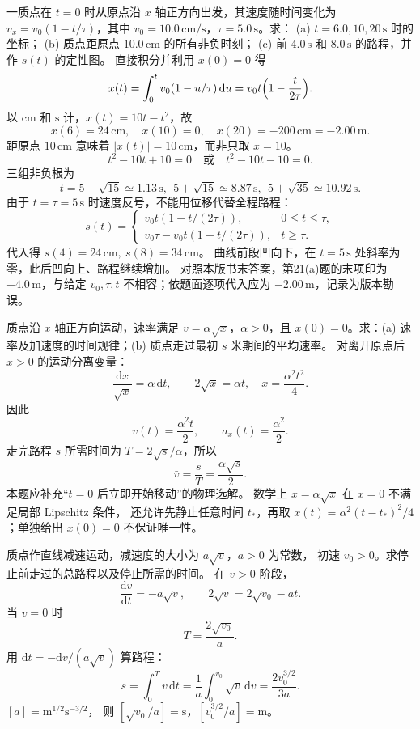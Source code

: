 一质点在 $t=0$ 时从原点沿 $x$ 轴正方向出发，其速度随时间变化为
$v_x=v_0(1-t/\tau)$，其中 $v_0=10.0\,\mathrm{cm/s}$，$\tau=5.0\,\mathrm s$。求：
(a) $t=6.0,10,20\,\mathrm s$ 时的坐标；
(b) 质点距原点 $10.0\,\mathrm{cm}$ 的所有非负时刻；
(c) 前 $4.0\,\mathrm s$ 和 $8.0\,\mathrm s$ 的路程，并作 $s(t)$ 的定性图。
\exsolution
直接积分并利用 $x(0)=0$ 得
\[
 x(t)=\int_0^t v_0(1-u/\tau)\,\mathrm du
 =v_0t\Bigl(1-\frac{t}{2\tau}\Bigr).
\]
以 $\mathrm{cm}$ 和 $\mathrm s$ 计，$x(t)=10t-t^2$，故
\[
 \boxed{x(6)=24\,\mathrm{cm},\quad x(10)=0,\quad
 x(20)=-200\,\mathrm{cm}=-2.00\,\mathrm m.}
\]
距原点 $10\,\mathrm{cm}$ 意味着 $|x(t)|=10\,\mathrm{cm}$，而非只取 $x=10$。
\[
 t^2-10t+10=0\quad\text{或}\quad t^2-10t-10=0.
\]
三组非负根为
\[
 \boxed{t=5-\sqrt{15}\simeq1.13\,\mathrm s,\ \
 5+\sqrt{15}\simeq8.87\,\mathrm s,\ \
 5+\sqrt{35}\simeq10.92\,\mathrm s.}
\]
由于 $t=\tau=5\,\mathrm s$ 时速度反号，不能用位移代替全程路程：
\[
 s(t)=\begin{cases}
 v_0t(1-t/(2\tau)),&0\le t\le\tau,\\
 v_0\tau-v_0t(1-t/(2\tau)),&t\ge\tau .
 \end{cases}
\]
代入得 $\boxed{s(4)=24\,\mathrm{cm},\ s(8)=34\,\mathrm{cm}}$。
曲线前段凹向下，在 $t=5\,\mathrm s$ 处斜率为零，此后凹向上、路程继续增加。
\excheck 对照本版书末答案，第21(a)题的末项印为 $-4.0\,\mathrm m$，与给定
$v_0,\tau,t$ 不相容；依题面逐项代入应为 $-2.00\,\mathrm m$，记录为版本勘误。

质点沿 $x$ 轴正方向运动，速率满足 $v=\alpha\sqrt{x}$，$\alpha>0$，且
$x(0)=0$。求：(a) 速率及加速度的时间规律；(b) 质点走过最初 $s$ 米期间的平均速率。
\exsolution
对离开原点后 $x>0$ 的运动分离变量：
\[
 \frac{\mathrm dx}{\sqrt{x}}=\alpha\,\mathrm dt,\qquad
 2\sqrt{x}=\alpha t,
\quad x=\frac{\alpha^2t^2}{4}.
\]
因此
\[
 \boxed{v(t)=\frac{\alpha^2t}{2},\qquad a_x(t)=\frac{\alpha^2}{2}.}
\]
走完路程 $s$ 所需时间为 $T=2\sqrt{s}/\alpha$，所以
\[
 \boxed{\bar v=\frac{s}{T}=\frac{\alpha\sqrt{s}}2.}
\]
\excheck 本题应补充“$t=0$ 后立即开始移动”的物理选解。
数学上 $\dot x=\alpha\sqrt{x}$ 在 $x=0$ 不满足局部 Lipschitz 条件，
还允许先静止任意时间 $t_*$，再取
$x(t)=\alpha^2(t-t_*)^2/4$；单独给出 $x(0)=0$ 不保证唯一性。

质点作直线减速运动，减速度的大小为 $a\sqrt v$，$a>0$ 为常数，
初速 $v_0>0$。求停止前走过的总路程以及停止所需的时间。
\exsolution
在 $v>0$ 阶段，
\[
 \frac{\mathrm dv}{\mathrm dt}=-a\sqrt v,\qquad
 2\sqrt v=2\sqrt{v_0}-at.
\]
当 $v=0$ 时
\[
 \boxed{T=\frac{2\sqrt{v_0}}a.}
\]
用 $\mathrm dt=-\mathrm dv/(a\sqrt v)$ 算路程：
\[
 s=\int_0^T v\,\mathrm dt
   =\frac1a\int_0^{v_0}\sqrt v\,\mathrm dv
   =\boxed{\frac{2v_0^{3/2}}{3a}}.
\]
\excheck $[a]=\mathrm{m}^{1/2}\mathrm{s}^{-3/2}$，
则 $[\sqrt{v_0}/a]=\mathrm s$，$[v_0^{3/2}/a]=\mathrm m$。

